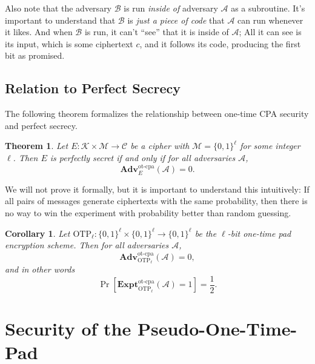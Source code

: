 \documentclass[11pt]{article}
\newtheorem{corollary}{Corollary}
\newtheorem{theorem}{Theorem}
\newcommand{\msgs}{\mathcal{M}}
\newcommand{\ctxts}{\mathcal{C}}
\newcommand{\keys}{\mathcal{K}}
\newcommand{\calA}{\mathcal{A}}
\newcommand{\calB}{\mathcal{B}}
\newcommand{\Adv}{\mathbf{Adv}}
\newcommand{\bits}{\{0,1\}}
\newcommand{\otp}{\mathrm{OTP}}
\newcommand{\ExptOTCPA}{\mathbf{Expt}^{\mathrm{ot\mbox{-}cpa}}}
\newcommand{\AdvOTCPA}[2]{\Adv^{\mathrm{ot\mbox{-}cpa}}_{#1}({#2})}
\begin{document}
Also note that the adversary $\calB$ is run \emph{inside of} adversary $\calA$
as a subroutine. It's important to understand that $\calB$ is \emph{just a
piece of code} that $\calA$ can run whenever it likes. And when $\calB$ is run,
it can't ``see'' that it is inside of $\calA$; All it can see is its input,
which is some ciphertext $c$, and it follows its code, producing the first bit
as promised.


\subsection{Relation to Perfect Secrecy}

The following theorem formalizes the relationship between one-time CPA
security and perfect secrecy.
\begin{theorem}
    Let $E:\keys\times\msgs\to\ctxts$ be a cipher with $\msgs = \bits^\ell$ for
    some integer $\ell$.  Then $E$ is perfectly secret if and only if for all
    adversaries $\calA$,
    \[
        \AdvOTCPA{E}{\calA} = 0.
    \]
\end{theorem}

We will not prove it formally, but it is important to understand this
intuitively: If all pairs of messages generate ciphertexts with the
same probability, then there is no way to win the experiment with
probability better than random guessing.

\begin{corollary}\label{cor}
    Let $\otp_\ell:\bits^\ell\times\bits^\ell\to\bits^\ell $ be the $\ell$-bit
    one-time pad encryption scheme. Then for all adversaries $\calA$,
    \[
        \AdvOTCPA{\otp_\ell}{\calA} = 0,
    \]
    and in other words
    \[
        \Pr[\ExptOTCPA_{\otp_\ell}(\calA) = 1] = \frac{1}{2}.
    \]
\end{corollary}



\section{Security of the Pseudo-One-Time-Pad}
\end{document}
